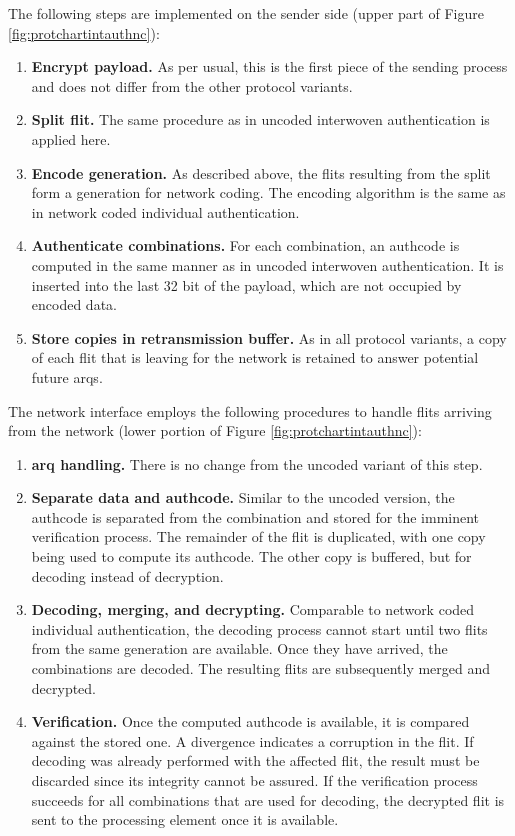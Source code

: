 The following steps are implemented on the sender side (upper part of Figure \ref{fig:protchartintauthnc}):
\begin{enumerate}
    \item \textbf{Encrypt payload.} As per usual, this is the first piece of the sending process and does not differ from the other protocol variants.
    \item \textbf{Split flit.} The same procedure as in uncoded interwoven authentication is applied here.
    \item \textbf{Encode generation.} As described above, the flits resulting from the split form a generation for network coding. The encoding
        algorithm is the same as in network coded individual authentication.
    \item \textbf{Authenticate combinations.} For each combination, an authcode is computed in the same manner as in uncoded interwoven
        authentication. It is inserted into the last 32 bit of the payload, which are not occupied by encoded data.
    \item \textbf{Store copies in retransmission buffer.} As in all protocol variants, a copy of each flit that is leaving for the network is retained
        to answer potential future \glspl{arq}.
\end{enumerate}
\vspace{0.5\baselineskip}

The network interface employs the following procedures to handle flits arriving from the network (lower portion of Figure
\ref{fig:protchartintauthnc}):
\begin{enumerate}
    \item \textbf{\Gls{arq} handling.} There is no change from the uncoded variant of this step.
    \item \textbf{Separate data and authcode.} Similar to the uncoded version, the authcode is separated from the combination and stored for the
        imminent verification process. The remainder of the flit is duplicated, with one copy being used to compute its authcode. The other copy is
        buffered, but for decoding instead of decryption.
    \item \textbf{Decoding, merging, and decrypting.} Comparable to network coded individual authentication, the decoding process cannot start until
        two flits from the same generation are available. Once they have arrived, the combinations are decoded. The resulting flits are subsequently
        merged and decrypted.
    \item \textbf{Verification.} Once the computed authcode is available, it is compared against the stored one. A divergence indicates a corruption
        in the flit. If decoding was already performed with the affected flit, the result must be discarded since its integrity cannot be assured. If
        the verification process succeeds for all combinations that are used for decoding, the decrypted flit is sent to the processing element once
        it is available.
\end{enumerate}
\vspace{0.5\baselineskip}

